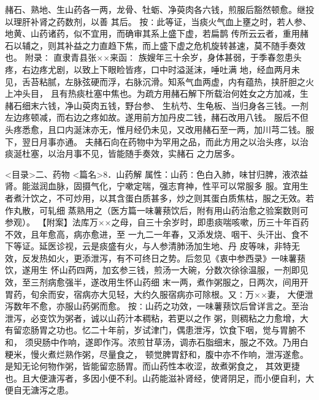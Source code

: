 \documentclass[a4paper,12pt,UTF8,twoside]{ctexbook}
\begin{document}
赭石、熟地、生山药各一两，龙骨、牡蛎、净萸肉各六钱，煎服后豁然顿愈。继投以理肝补肾之药数剂，以善 
其后。 
按∶此等证，当痰火气血上壅之时，若人参、地黄、山药诸药，似不宜用，而确审其系上盛下虚，若扁鹊 
传所云云者，重用赭石以辅之，则其补益之力直趋下焦，而上盛下虚之危机旋转甚速，莫不随手奏效也。 
附录∶ 
直隶青县张××来函∶ 
族嫂年三十余岁，身体甚弱，于季春忽患头疼，右边疼尤剧，以致上下眼睑皆疼，口中时溢涎沫，唾吐满 
地，经血两月未见，舌苔粘腻，左脉弦硬而浮，右脉沉滑。知系气血两虚，内有蕴热，挟肝胆之火上冲头目， 
且有热痰杜塞中焦也。为疏方用赭石解下所载治何姓女之方加减，生赭石细末六钱，净山萸肉五钱，野台参、 
生杭芍、生龟板、当归身各三钱。一剂左边疼顿减，而右边之疼如故。遂用前方加丹皮二钱，赭石改用八钱。 
服后不但头疼悉愈，且口内涎沫亦无，惟月经仍未见，又改用赭石至一两，加川芎二钱。服下，翌日月事亦通。 
夫赭石向在药物中为罕用之品，而此方用之以治头疼，以治痰涎杜塞，以治月事不见，皆能随手奏效，实赭石 
之力居多。 

<目录>二、药物
<篇名>8．山药解
属性：山药∶色白入肺，味甘归脾，液浓益肾。能滋润血脉，固摄气化，宁嗽定喘，强志育神，性平可以常服多 
服。宜用生者煮汁饮之，不可炒用，以其含蛋白质甚多，炒之则其蛋白质焦枯，服之无效。若作丸散，可轧细 
蒸熟用之（医方篇一味薯蓣饮后，附有用山药治愈之验案数则可参观）。 
【附案】法库万××之母，自三十余岁时，即患痰喘咳嗽，历三十年百药不效，且年愈高，病亦愈进，至 
一九二一年春，又添发烧、咽干、头汗出、食不下等证。延医诊视，云是痰盛有火，与人参清肺汤加生地、丹 
皮等味，非特无效，反发热如火，更添泄泻，有不可终日之势。后忽见《衷中参西录》一味薯蓣饮，遂用生 
怀山药四两，加玄参三钱，煎汤一大碗，分数次徐徐温服，一剂即见效，至三剂病愈强半，遂改用生怀山药细 
末一两，煮作粥服之，日两次，间用开胃药，旬余而安，宿病亦大见轻，大约久服宿病亦可除根。又∶万××妻， 
大便泄泻数年不愈，亦服山药粥而愈。 
按∶山药之功效，一味薯蓣饮后曾详言之。至治泄泻，必变饮为粥者，诚以山药汁本稠粘，若更以之作 
粥，则稠粘之力愈增，大有留恋肠胃之功也。忆二十年前，岁试津门，偶患泄泻，饮食下咽，觉与胃腑不和， 
须臾肠中作响，遂即作泻。浓煎甘草汤，调赤石脂细末，服之不效。乃用白粳米，慢火煮烂熟作粥，尽量食之， 
顿觉脾胃舒和，腹中亦不作响，泄泻遂愈。是知无论何物作粥，皆能留恋肠胃。而山药性本收涩，故煮粥食之， 
其效更捷也。且大便溏泻者，多因小便不利。山药能滋补肾经，使肾阴足，而小便自利，大便自无溏泻之患。 
\end{document}
